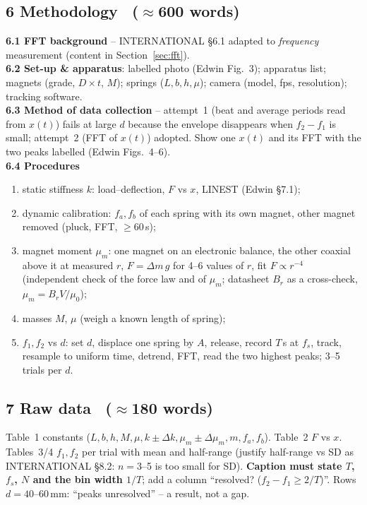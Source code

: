 \documentclass[11pt,a4paper]{article}
\newcommand{\muz}{\mu_0}
\newcommand{\mum}{\mu_m}
\newcommand{\words}[1]{~{\small\color{gray}($\approx$#1 words)}}
\begin{document}
\subsection*{6 Methodology \words{600}}
\textbf{6.1 FFT background} -- INTERNATIONAL \S6.1 adapted to \emph{frequency} measurement
(content in Section~\ref{sec:fft}).\\
\textbf{6.2 Set-up \& apparatus}: labelled photo (Edwin Fig.~3); apparatus list; magnets
(grade, $D\times t$, $M$); springs ($L,b,h,\mu$); camera (model, fps, resolution); tracking
software.\\
\textbf{6.3 Method of data collection} -- attempt~1 (beat and average periods read from
$x(t)$) fails at large $d$ because the envelope disappears when $f_2-f_1$ is small;
attempt~2 (FFT of $x(t)$) adopted. Show one $x(t)$ and its FFT with the two peaks labelled
(Edwin Figs.~4--6).\\
\textbf{6.4 Procedures}
\begin{enumerate}[label=6.4.\arabic*]
\item static stiffness $k$: load--deflection, $F$ vs $x$, LINEST (Edwin \S7.1);
\item dynamic calibration: $f_a,f_b$ of each spring with its own magnet, other magnet removed
(pluck, FFT, $\ge60$\,s);
\item magnet moment $\mum$: one magnet on an electronic balance, the other coaxial above it at
measured $r$, $F=\Delta m\,g$ for 4--6 values of $r$, fit $F\propto r^{-4}$ (independent
check of the force law and of $\mum$; datasheet $B_r$ as a cross-check, $\mum=B_rV/\muz$);
\item masses $M$, $\mu$ (weigh a known length of spring);
\item $f_1,f_2$ vs $d$: set $d$, displace one spring by $A$, release, record $T$\,s at $f_s$,
track, resample to uniform time, detrend, FFT, read the two highest peaks; 3--5 trials per $d$.
\end{enumerate}

\subsection*{7 Raw data \words{180}}
Table~1 constants ($L,b,h,M,\mu,k\pm\Delta k,\mum\pm\Delta\mum,m,f_a,f_b$). Table~2 $F$ vs $x$.
Tables~3/4 $f_1,f_2$ per trial with mean and half-range (justify half-range vs SD as
INTERNATIONAL \S8.2: $n=3$--5 is too small for SD). \textbf{Caption must state $T$, $f_s$, $N$
and the bin width $1/T$}; add a column ``resolved? ($f_2-f_1\ge2/T$)''. Rows $d=40$--60\,mm:
``peaks unresolved'' -- a result, not a gap.
\end{document}
